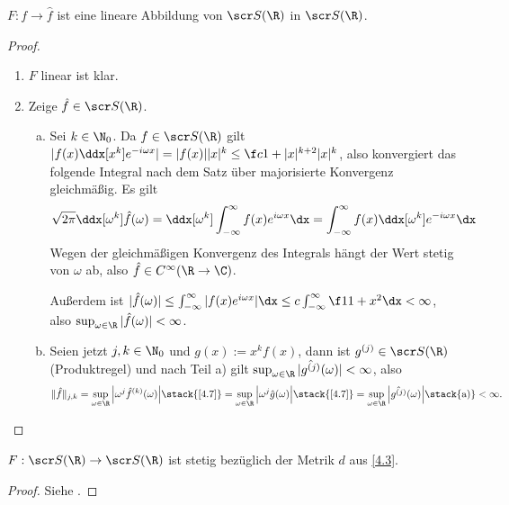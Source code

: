 \begin{st} \label{4.8}
	$F : f \to \hat f$ ist eine lineare Abbildung von $\scr S(\R)$ in $\scr S(\R)$.

	\begin{proof}
		\begin{enumerate}[1)]
			\item
				$F$ linear ist klar.
			\item
				Zeige $\hat f \in \scr S(\R)$.
				\begin{enumerate}[a)]
					\item
						Sei $k \in \N_0$.
						Da $f \in \scr S(\R)$ gilt $|f(x) \ddx[x^k] e^{-i\omega x}| = |f(x)||x|^k \le \f c{1+|x|^{k+2}} |x|^k$, also konvergiert das folgende Integral nach dem Satz über majorisierte Konvergenz gleichmäßig.
						Es gilt
						\begin{align*}
							\sqrt{2\pi} \ddx[\omega^k] \hat f(\omega)
							= \ddx[\omega^k] \int_{-\infty}^\infty f(x) e^{i \omega x} \dx
							= \int_{-\infty}^\infty f(x) \ddx[\omega^k] e^{- i \omega x} \dx
						\end{align*}
						Wegen der gleichmäßigen Konvergenz des Integrals hängt der Wert stetig von $\omega$ ab, also $\hat f \in C^\infty(\R \to \C)$.

						Außerdem ist $|\hat f(\omega)| \le \int_{-\infty}^\infty |f(x) e^{i\omega x}| \dx \le c \int_{-\infty}^\infty \f 1{1+x^2} \dx < \infty$, also $\sup_{\omega\in\R} |\hat f(\omega)| < \infty$.
					\item
						Seien jetzt $j,k \in \N_0$ und $g(x) := x^k f(x)$, dann ist $g^{(j)} \in \scr S(\R)$ (Produktregel) und nach Teil a) gilt $\sup_{\omega \in \R}|\hat {g^{(j)}}(\omega)| < \infty$, also
						\[
							\|\hat f\|_{j,k}
							= \sup_{\omega\in\R} \Big| \omega^j {\hat f}^{(k)}(\omega) \Big|
							\stack{\ref{4.7}}= \sup_{\omega\in\R} \Big| \omega^j \hat g(\omega) \Big|
							\stack{\ref{4.7}}= \sup_{\omega\in\R} \Big| \hat {g^{(j)}}(\omega) \Big|
							\stack{\text{a)}}< \infty.
						\]
				\end{enumerate}
		\end{enumerate}
	\end{proof}
\end{st}

\begin{nt} \label{4.9}
	$F : \scr S(\R) \to \scr S(\R)$ ist stetig bezüglich der Metrik $d$ aus \ref{4.3}.
	\begin{proof}
		Siehe .
	\end{proof}
\end{nt}

